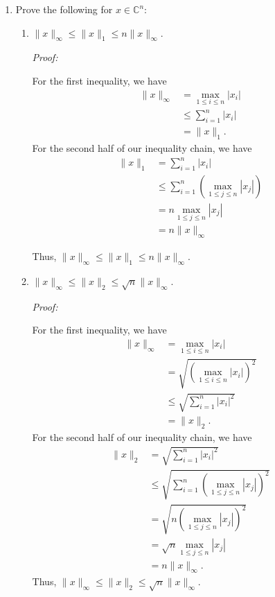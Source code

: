 \documentclass[a4paper,12pt]{article}
\newcommand{\comps}{\mathbb{C}}
\newcommand{\abs}[1]{\left| #1 \right|}
\newcommand{\norm}[1]{\lVert #1 \rVert}
\newenvironment{proof}[2][$\square$]
    {\setlength{\parskip}{0pt}\par\textit{Proof:} #2\setlength{\parskip}{0.25cm}
        \savebox{\qed}{#1}
        \begin{adjustwidth}{\widthof{Proof:}}{}
    }
    {
        \hfill\usebox{\qed}\end{adjustwidth}
    }
\begin{document}
\begin{enumerate}[label = \arabic*.]
	\item Prove the following for $ x \in \comps^n $:
		\begin{enumerate}[label = (\alph*)]
			\item $ \norm{x}_\infty \leq \norm{x}_1 \leq n \norm{x}_\infty $.
				\begin{proof}{}
					For the first inequality, we have
					\begin{align*}
						\norm{x}_\infty &= \max_{1 \leq i \leq n} \abs{x_i} \\
						&\leq \sum_{i=1}^n \abs{x_i} \\
						&= \norm{x}_1.
					\end{align*}
					 For the second half of our inequality chain, we have
					 \begin{align*}
					 	\norm{x}_1 &= \sum_{i=1}^{n} \abs{x_i} \\
					 	&\leq \sum_{i=1}^{n} \left(\max_{1 \leq j \leq n} \abs{x_j}\right) \\
					 	&= n \max_{1 \leq j \leq n} \abs{x_j} \\
					 	&= n \norm{x}_\infty
					 \end{align*}
				 
				 	Thus, $ \norm{x}_\infty \leq \norm{x}_1 \leq n\norm{x}_\infty $.
				\end{proof}
			
			\item $ \norm{x}_\infty \leq \norm{x}_2 \leq \sqrt{n}\norm{x}_\infty $.
				\begin{proof}{}
					For the first inequality, we have
					\begin{align*}
						\norm{x}_\infty &= \max_{1 \leq i \leq n} \abs{x_i} \\
						&= \sqrt{\left(\max_{1 \leq i \leq n} \abs{x_i}\right)^2} \\
						&\leq \sqrt{\sum_{i=1}^{n} \abs{x_i}^2} \\
						&= \norm{x}_2.
					\end{align*}
					For the second half of our inequality chain, we have
					\begin{align*}
						\norm{x}_2 &= \sqrt{\sum_{i=1}^{n} \abs{x_i}^2} \\
						&\leq \sqrt{\sum_{i=1}^{n} \left(\max_{1 \leq j \leq n}\abs{x_j}\right)^2} \\
						&= \sqrt{n \left(\max_{1 \leq j \leq n} \abs{x_j}\right)^2} \\
						&= \sqrt{n} \max_{1 \leq j \leq n} \abs{x_j} \\
						&= n \norm{x}_\infty.
					\end{align*}
						Thus, $ \norm{x}_\infty \leq \norm{x}_2 \leq \sqrt{n} \norm{x}_\infty $.
				\end{proof}
			

\end{enumerate}
\end{enumerate}
\end{document}
